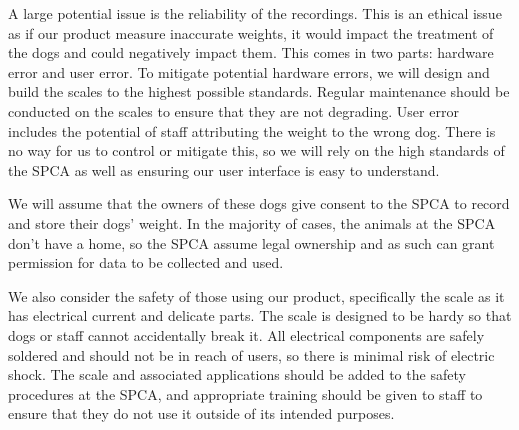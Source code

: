 A large potential issue is the reliability of the recordings. This is an ethical issue as if our product measure inaccurate weights, it would impact the treatment of the dogs and could negatively impact them. This comes in two parts: hardware error and user error. To mitigate potential hardware errors, we will design and build the scales to the highest possible standards. Regular maintenance should be conducted on the scales to ensure that they are not degrading. User error includes the potential of staff attributing the weight to the wrong dog. There is no way for us to control or mitigate this, so we will rely on the high standards of the SPCA as well as ensuring our user interface is easy to understand. 

We will assume that the owners of these dogs give consent to the SPCA to record and store their dogs’ weight. In the majority of cases, the animals at the SPCA don’t have a home, so the SPCA assume legal ownership and as such can grant permission for data to be collected and used. 

We also consider the safety of those using our product, specifically the scale as it has electrical current and delicate parts. The scale is designed to be hardy so that dogs or staff cannot accidentally break it. All electrical components are safely soldered and should not be in reach of users, so there is minimal risk of electric shock. The scale and associated applications should be added to the safety procedures at the SPCA, and appropriate training should be given to staff to ensure that they do not use it outside of its intended purposes. 

